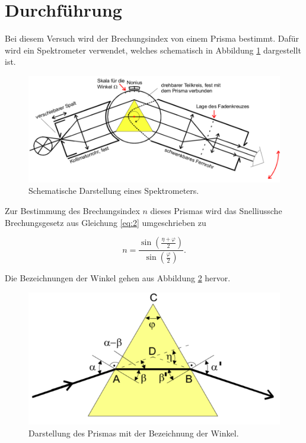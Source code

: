 \section{Durchführung}

Bei diesem Versuch wird der Brechungsindex von einem Prisma bestimmt. Dafür wird
ein Spektrometer verwendet, welches schematisch in Abbildung \ref{abb:2} dargestellt
ist.

\begin{figure}[H]
  \centering
  \includegraphics[width=\textwidth]{content/Spektrometer.png}
  \caption{Schematische Darstellung eines Spektrometers. \cite{1}}
  \label{abb:2}
\end{figure}

Zur Bestimmung des Brechungsindex $n$ dieses Prismas wird das Snelliussche Brechungsgesetz
aus Gleichung \ref{eq:2} umgeschrieben zu

\begin{equation}
  n = \frac{\sin(\frac{\eta + \varphi}{2})}{\sin(\frac{\varphi}{2})}.
  \label{eq:5}
\end{equation}

Die Bezeichnungen der Winkel gehen aus Abbildung \ref{abb:3} hervor.

\begin{figure}[H]
  \centering
  \includegraphics[width=\textwidth]{content/Prisma.png}
  \caption{Darstellung des Prismas mit der Bezeichnung der Winkel. \cite{1}}
  \label{abb:3}
\end{figure}

